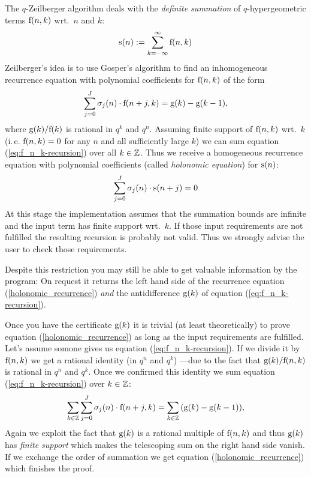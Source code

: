 The $q$-Zeilberger algorithm \cite{Koornwinder}
deals with the {\sl definite summation} of 
$q$-hyper\-geo\-metric terms ${\mathrm f}(n,k)$ wrt.\ $n$ and $k$:
\[
	{\mathrm s}(n):= \sum_{k=-\infty}^\infty{{\mathrm f}(n,k)}
\]
Zeilberger's idea is to use Gosper's algorithm to find an
inhomogeneous recurrence equation with polynomial coefficients
for ${\mathrm f}(n,k)$ of the form
\begin{equation} \label{eq:f_n_k-recursion}
	\sum_{j=0}^J{{\mathrm \sigma}_{j}(n)\cdot {\mathrm f}(n+j,k)} = 
	{\mathrm g}(k)-{\mathrm g}(k-1),
\end{equation}
where ${\mathrm g}(k)/{\mathrm f}(k)$ is rational in $q^k$ and $q^n$.
Assuming finite support of ${\mathrm f}(n,k)$ wrt.\ $k$
(i.\,e. ${\mathrm f}(n,k)=0$ for any $n$ and all sufficiently large $k$)
we can sum equation (\ref{eq:f_n_k-recursion}) over all $k\in\Bbb Z$.
Thus we receive a homogeneous recurrence equation with polynomial
coefficients (called {\sl holonomic equation}) for ${\mathrm s}(n)$:
\begin{equation} \label{holonomic_recurrence}
	\sum_{j=0}^J{{\mathrm \sigma}_{j}(n)\cdot {\mathrm s}(n+j)} = 0
\end{equation}
%
At this stage the implementation assumes that the summation
bounds are infinite and the input term has finite support wrt.\ $k$.
If those input requirements are not fulfilled the resulting 
recursion is probably not valid. Thus we strongly advise the user to 
check those requirements.

Despite this restriction you may still be able to get valuable
information by the program: On request it returns the
left hand side of the recurrence equation (\ref{holonomic_recurrence})
\textsl{and} the antidifference ${\mathrm g}(k)$ of equation
(\ref{eq:f_n_k-recursion}). 

Once you have the certificate ${\mathrm g}(k)$ it is trivial
(at least theoretically) to prove equation (\ref{holonomic_recurrence})
as long as the input requirements are fulfilled. Let's assume
somone gives us equation (\ref{eq:f_n_k-recursion}). If we divide
it by ${\mathrm f}(n,k)$ we get a rational identity (in $q^n$ and $q^k$) 
---due to the fact that ${\mathrm g}(k)/{\mathrm f}(n,k)$ is rational in 
$q^n$ and $q^k$. Once we confirmed this identity we sum equation
(\ref{eq:f_n_k-recursion}) over $k\in\Bbb Z$:
\begin{equation}
	\sum_{k\in\Bbb Z}\sum_{j=0}^J{{\mathrm \sigma}_{j}(n)\cdot {\mathrm f}(n+j,k)} = 
	\sum_{k\in\Bbb Z}{\left({\mathrm g}(k)-{\mathrm g}(k-1)\right)},
\end{equation}
Again we exploit the
fact that ${\mathrm g}(k)$ is a rational multiple of ${\mathrm f}(n,k)$ and thus
${\mathrm g}(k)$ has \textsl{finite support} which makes the telescoping sum
on the right hand side vanish. If we exchange the order of summation we
get equation (\ref{holonomic_recurrence}) which finishes the proof. 


